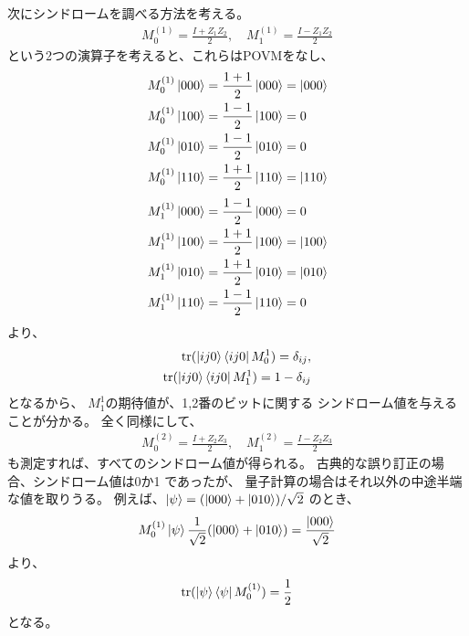 \documentclass[]{ltjsarticle}
\DeclareMathOperator{\tr}{tr}
\begin{document}
次にシンドロームを調べる方法を考える。
\begin{align}
    M_0^{(1)} = \frac{I + Z_1Z_2}{2}, \quad
    M_1^{(1)} = \frac{I - Z_1Z_2}{2}
\end{align}
という2つの演算子を考えると、これらはPOVMをなし、
\begin{align}
    M_0^{(1)} \ket{000} 
    &=
    \frac{1 + 1}{2} \ket{000}
    =
    \ket{000} \\
    M_0^{(1)} \ket{100} 
    &=
    \frac{1 - 1}{2} \ket{100}
    =
    0 \\
    M_0^{(1)} \ket{010} 
    &=
    \frac{1 - 1}{2} \ket{010}
    =
    0 \\
    M_0^{(1)} \ket{110} 
    &=
    \frac{1 + 1}{2} \ket{110}
    =
    \ket{110}
\end{align}
\begin{align}
    M_1^{(1)} \ket{000} 
    &=
    \frac{1 - 1}{2} \ket{000}
    =
    0 \\
    M_1^{(1)} \ket{100} 
    &=
    \frac{1 + 1}{2} \ket{100}
    =
    \ket{100} \\
    M_1^{(1)} \ket{010} 
    &=
    \frac{1 + 1}{2} \ket{010}
    =
    \ket{010} \\
    M_1^{(1)} \ket{110} 
    &=
    \frac{1 - 1}{2} \ket{110}
    =
    0
\end{align}
より、
\begin{align}
    \tr(\ket{ij0}\bra{ij0} M_0^{1})
    =
    \delta_{ij}, \\
    \tr(\ket{ij0}\bra{ij0} M_1^{1})
    =
    1 - \delta_{ij}
\end{align}
となるから、
$M_1^{1}$の期待値が、1,2番のビットに関する
シンドローム値を与えることが分かる。
全く同様にして、
\begin{align}
    M_0^{(2)} = \frac{I + Z_2Z_3}{2}, \quad
    M_1^{(2)} = \frac{I - Z_2Z_3}{2}
\end{align}
も測定すれば、すべてのシンドローム値が得られる。
古典的な誤り訂正の場合、シンドローム値は0か1
であったが、
量子計算の場合はそれ以外の中途半端な値を取りうる。
例えば、$\ket{\psi} = (\ket{000} + \ket{010})/\sqrt{2}$
のとき、
\begin{align}
    M_0^{(1)}\ket{\psi}
    \frac{1}{\sqrt{2}}(\ket{000} + \ket{010})
    =
    \frac{\ket{000}}{\sqrt{2}}
\end{align}
より、
\begin{align}
    \tr(\ket{\psi}\bra{\psi}M_0^{(1)})
    =
    \frac{1}{2}
\end{align}
となる。
\end{document}
